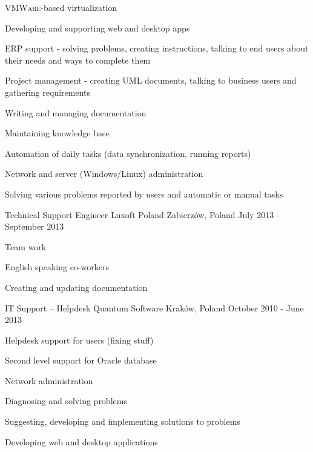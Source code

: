 \begin{cventries}
{\begin{cvitems}
        \item {\textsc{VMWare}-based virtualization}
   		  \item {Developing and supporting web and desktop apps}
        \item {ERP support - solving problems, creating instructions, talking to end users about their needs and ways to complete them}
        \item {Project management - creating \textsc{UML} documents, talking to business users and gathering requirements}
        \item {Writing and managing documentation}
        \item {Maintaining knowledge base}
        \item {Automation of daily tasks (data synchronization, running reports)}
        \item {Network and server (Windows/Linux) administration}
        \item {Solving various problems reported by users and automatic or manual tasks}
      \end{cvitems}
    }
  \cventry
    {Technical Support Engineer}
    {Luxoft Poland}
    {Zabierzów, Poland}
    {July 2013 - September 2013}
    {
      \begin{cvitems}
        \item {Team work}
       	\item {English speaking co-workers}
       	\item {Creating and updating documentation}
      \end{cvitems} 
    }
  \cventry
    {IT Support -- Helpdesk}
    {Quantum Software}
    {Kraków, Poland}
    {October 2010 - June 2013}
    {
      \begin{cvitems}
        \item {Helpdesk support for users (fixing stuff)}
        \item {Second level support for Oracle database}
        \item {Network administration}
        \item {Diagnosing and solving problems}
        \item {Suggesting, developing and implementing solutions to problems}
        \item {Developing web and desktop applications}
      \end{cvitems}
    }
\end{cventries}
